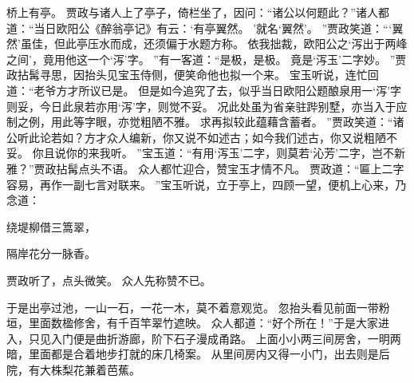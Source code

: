桥上有亭。
贾政与诸人上了亭子，倚栏坐了，因问：“诸公以何题此？”诸人都道：“当日欧阳公《醉翁亭记》有云：‘有亭翼然。
’就名‘翼然’。
”贾政笑道：“‘翼然’虽佳，但此亭压水而成，还须偏于水题方称。
依我拙裁，欧阳公之‘泻出于两峰之间’，竟用他这一个‘泻’字。
”有一客道：“是极，是极。
竟是‘泻玉’二字妙。
”贾政拈髯寻思，因抬头见宝玉侍侧，便笑命他也拟一个来。
宝玉听说，连忙回道：“老爷方才所议已是。
但是如今追究了去，似乎当日欧阳公题酿泉用一‘泻’字则妥，今日此泉若亦用‘泻’字，则觉不妥。
况此处虽为省亲驻跸别墅，亦当入于应制之例，用此等字眼，亦觉粗陋不雅。
求再拟较此蕴藉含蓄者。
”贾政笑道：“诸公听此论若如？方才众人编新，你又说不如述古；如今我们述古，你又说粗陋不妥。
你且说你的来我听。
”宝玉道：“有用‘泻玉’二字，则莫若‘沁芳’二字，岂不新雅？”贾政拈髯点头不语。
众人都忙迎合，赞宝玉才情不凡。
贾政道：“匾上二字容易，再作一副七言对联来。
”宝玉听说，立于亭上，四顾一望，便机上心来，乃念道：\par
\hop
绕堤柳借三篙翠，\par
隔岸花分一脉香。
\par
{}\par
\hop
贾政听了，点头微笑。
众人先称赞不已。
\par
于是出亭过池，一山一石，一花一木，莫不着意观览。
忽抬头看见前面一带粉垣，里面数楹修舍，有千百竿翠竹遮映。
众人都道：“好个所在！”于是大家进入，只见入门便是曲折游廊，阶下石子漫成甬路。
上面小小两三间房舍，一明两暗，里面都是合着地步打就的床几椅案。
从里间房内又得一小门，出去则是后院，有大株梨花兼着芭蕉。
